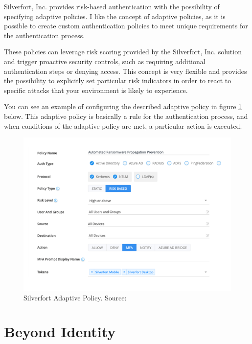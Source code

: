 Silverfort, Inc. provides risk-based authentication with the possibility of specifying adaptive policies.
I like the concept of adaptive policies, as it is possible to create custom authentication policies to meet unique requirements for the authentication process.

These policies can leverage risk scoring provided by the Silverfort, Inc. solution and trigger proactive security controls, such as requiring additional authentication steps or denying access. 
This concept is very flexible and provides the possibility to explicitly set particular risk indicators in order to react to specific attacks that your environment is likely to experience.

You can see an example of configuring the described adaptive policy in figure \ref{fig:silverfort-auth-policy} below.
This adaptive policy is basically a rule for the authentication process, and when conditions of the adaptive policy are met, a particular action is executed.\cite{example_silverfort}

\begin{figure}[htbp]
  \centering
  \includegraphics[width=1\textwidth]{img/silverfort-auth-policy.png}
  \caption[Silverfort Adaptive Policy]{Silverfort Adaptive Policy. Source: \cite{example_silverfort}}
  \label{fig:silverfort-auth-policy}
\end{figure}

\newpage
\section{Beyond Identity}

